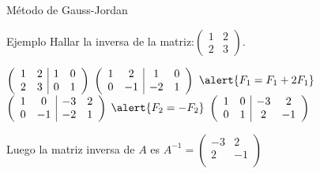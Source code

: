 \documentclass[9pt]{beamer}
\newenvironment{gaussjordandos}{\left( \begin{array}{cc|cc}}{\end{array}\right)}
\begin{document}
\begin{frame}{Método de Gauss-Jordan}

\begin{exampleblock}{Ejemplo}
 Hallar la inversa de  la matriz:$\begin{pmatrix}
1 & 2  \\
2 & 3   \end{pmatrix}$.
\end{exampleblock}

\pause
$
\begin{gaussjordandos}
1 & 2  & 1& 0 \\
  2& 3  & 0& 1 \\
\end{gaussjordandos}
$
\pause
{}
\pause
$
\begin{gaussjordandos}
 1& 2  & 1& 0 \\
 0& -1  & -2& 1 \\
\end{gaussjordandos}
$
\pause
$\alert{F_1=F_1+2F_1} $
\pause
$\begin{gaussjordandos}
 1& 0  & -3& 2 \\
 0& -1  & -2& 1 \\
\end{gaussjordandos}$
\pause
$\alert{F_2=-F_2}$
\pause
$
\begin{gaussjordandos}
 1& 0 &  -3& 2 \\
 0& 1  & 2& -1 \\
\end{gaussjordandos}
$

Luego la matriz inversa de $A$ es $A^{-1}=\begin{pmatrix}
  -3& 2 \\
  2& -1 \\
\end{pmatrix}$

\end{frame}
\end{document}
